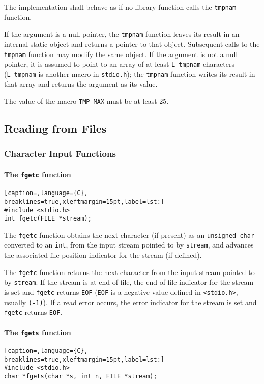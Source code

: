 The implementation shall behave as if no library function calls the
\texttt{tmpnam} function.

If the argument is a null pointer, the \texttt{tmpnam} function leaves its
result in an internal static object and returns a pointer to that object.
Subsequent calls to the \texttt{tmpnam} function may modify the same object. If
the argument is not a null pointer, it is assumed to point to an array of at
least \texttt{L\_tmpnam} characters (\texttt{L\_tmpnam} is another macro in
\texttt{stdio.h}); the \texttt{tmpnam} function writes its result in that array
and returns the argument as its value.

The value of the macro \texttt{TMP\_MAX} must be at least 25.

\subsection{Reading from Files}
\subsubsection{Character Input Functions}
\paragraph{The \texttt{fgetc} function}
\lstset{basicstyle=\scriptsize, numbers=left, captionpos=b, tabsize=4}
\begin{lstlisting}[caption=,language={C},
breaklines=true,xleftmargin=15pt,label=lst:]
#include <stdio.h>
int fgetc(FILE *stream);
\end{lstlisting}

The \texttt{fgetc} function obtains the next character (if present) as an
\texttt{unsigned char} converted to an \texttt{int}, from the input stream
pointed to by \texttt{stream}, and advances the associated file position
indicator for the stream (if defined). 

The \texttt{fgetc} function returns the next character from the input stream
pointed to by \texttt{stream}. If the stream is at end-of-file, the end-of-file
indicator for the stream is set and \texttt{fgetc} returns \texttt{EOF}
(\texttt{EOF} is a negative value defined in
\texttt{\textless{}stdio.h\textgreater{}}, usually \texttt{(-1)}). If a read
error occurs, the error indicator for the stream is set and \texttt{fgetc}
returns \texttt{EOF}.

\paragraph{The \texttt{fgets} function}
\lstset{basicstyle=\scriptsize, numbers=left, captionpos=b, tabsize=4}
\begin{lstlisting}[caption=,language={C},
breaklines=true,xleftmargin=15pt,label=lst:]
#include <stdio.h>
char *fgets(char *s, int n, FILE *stream);
\end{lstlisting}

